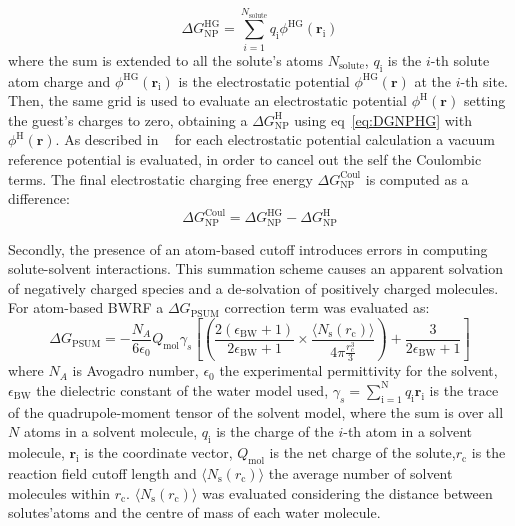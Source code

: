 \documentclass[11pt,oneside,a4paper]{article}
\begin{document}
\begin{equation}
 \label{eq:DGNPHG}
 \Delta G_\mathrm{NP}^\mathrm{HG} = \sum_{i=1}^{N_\mathrm{solute}} q_\mathrm{i}\phi^\mathrm{HG}(\mathbf{r_\mathrm{i}})
\end{equation}
where the sum is extended to all the solute's atoms $N_\mathrm{solute}$, $q_\mathrm{i}$ is the $i$-th solute atom charge and $\phi^\mathrm{HG}(\mathbf{r_\mathrm{i}})$ is the electrostatic potential $\phi^\mathrm{HG}(\mathbf{r})$ at the $i$-th site.
Then, the same grid is used  to evaluate an electrostatic potential $\phi^\mathrm{H}(\mathbf{r})$ setting the guest's charges to zero, obtaining a $\Delta G_\mathrm{NP}^\mathrm{H}$ using eq~\ref{eq:DGNPHG} with $\phi^\mathrm{H}(\mathbf{r})$.
As described in ~\cite{gilson1993computation,madura1995electrostatics,fogolari2002poisson} for each electrostatic potential calculation a vacuum reference potential is evaluated, in order to cancel out the self the Coulombic terms.
The final electrostatic charging free energy $\Delta G_\mathrm{NP}^\mathrm{Coul}$ is computed as a difference:
\begin{equation}
 \label{eq:DGNPcoul}
 \Delta G_\mathrm{NP}^\mathrm{Coul} = \Delta G_\mathrm{NP}^\mathrm{HG} - \Delta G_\mathrm{NP}^\mathrm{H}
\end{equation}


Secondly, the presence of an atom-based cutoff introduces errors in computing solute-solvent interactions. This summation scheme causes an apparent solvation of negatively charged species and a de-solvation of positively charged molecules. For atom-based BWRF a $\Delta G_\mathrm{PSUM}$ correction term was evaluated as:
\begin{equation}
 \label{eq:DGPSUM}
 \Delta G_\mathrm{PSUM} = -\frac{N_A}{6\epsilon_0} Q_\mathrm{mol}\gamma_s \left[ \left( \frac{2(\epsilon_\mathrm{BW} + 1)}{2\epsilon_\mathrm{BW} +1 } \times \frac{\langle N_\mathrm{s}(r_\mathrm{c}) \rangle} {4\pi \frac{r_c^3}{3} } \right) + \frac{3}{2\epsilon_\mathrm{BW} +1 } \right]
\end{equation}
where $N_A$ is Avogadro number, $\epsilon_0$ the experimental permittivity for the solvent, $\epsilon_\mathrm{BW}$ the dielectric constant of the water model used, $\gamma_s=\sum_\mathrm{i=1}^\mathrm{N} q_\mathrm{i}\mathbf{r_\mathrm{i}}$ is the trace of the quadrupole-moment tensor of the solvent model, where the sum is over all $N$ atoms in a solvent molecule, $q_\mathrm{i}$ is the charge of the $i$-th atom in a solvent molecule, $\mathbf{r_\mathrm{i}}$ is the coordinate vector, $Q_\mathrm{mol}$ is the net charge of the solute,$r_\mathrm{c}$ is the reaction field cutoff length and $\langle N_\mathrm{s}(r_\mathrm{c})\rangle$ the average number of solvent molecules within $r_\mathrm{c}$. $\langle N_\mathrm{s}(r_\mathrm{c})\rangle$ was evaluated considering the distance between solutes'atoms and the centre of mass of each water molecule.
\end{document}
